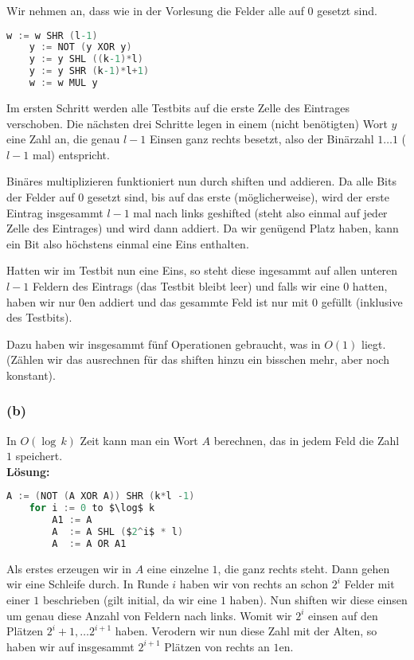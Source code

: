 \documentclass[11pt,a4paper,ngerman]{article}
\begin{document}
Wir nehmen an, dass wie in der Vorlesung die Felder alle auf $0$ gesetzt sind.

\begin{lstlisting}[frame=single, language=C,morekeywords={:=,SHR,SHL,NOT,XOR,AND,OR,MUL}]
	w := w SHR (l-1)
	y := NOT (y XOR y)
	y := y SHL ((k-1)*l)
	y := y SHR (k-1)*l+1)
	w := w MUL y
\end{lstlisting}

Im ersten Schritt werden alle Testbits auf die erste Zelle des Eintrages verschoben. Die nächsten drei Schritte
legen in einem (nicht benötigten) Wort $y$ eine Zahl an, die genau $l-1$ Einsen ganz rechts besetzt, also der Binärzahl
$1\ldots1$ ($l-1$ mal) entspricht.

Binäres multiplizieren funktioniert nun durch shiften und addieren. Da alle Bits der Felder auf $0$ gesetzt sind, bis auf das erste (möglicherweise),
wird der erste Eintrag insgesammt $l-1$ mal nach links geshifted (steht also einmal auf jeder Zelle des Eintrages) und wird dann addiert.
Da wir genügend Platz haben, kann ein Bit also höchstens einmal eine Eins enthalten.

Hatten wir im Testbit nun eine Eins, so steht diese ingesammt auf allen unteren $l-1$ Feldern des Eintrags (das Testbit bleibt leer) und
falls wir eine $0$ hatten, haben wir nur $0$en addiert und das gesammte Feld ist nur mit $0$ gefüllt (inklusive des Testbits).

Dazu haben wir insgesammt fünf Operationen gebraucht, was in $O(1)$ liegt. (Zählen wir das ausrechnen für das shiften hinzu ein bisschen mehr, aber noch konstant).

\subsubsection*{(b)}
In $O(\log \, k)$ Zeit kann man ein Wort $A$ berechnen, das in jedem Feld die Zahl $1$ speichert.\\

\noindent\textbf{Lösung:}\\

\begin{lstlisting}[frame=single, language=C,morekeywords={:=,SHR,SHL,NOT,XOR,AND,OR,MUL}]
	A := (NOT (A XOR A)) SHR (k*l -1)
	for i := 0 to $\log$ k
		A1 := A
		A  := A SHL ($2^i$ * l)
		A  := A OR A1
\end{lstlisting}

Als erstes erzeugen wir in $A$ eine einzelne $1$, die ganz rechts steht. Dann gehen wir eine Schleife durch. In Runde $i$ haben
wir von rechts an schon $2^i$ Felder mit einer $1$ beschrieben (gilt initial, da wir eine $1$ haben). Nun shiften wir diese einsen
um genau diese Anzahl von Feldern nach links. Womit wir $2^i$ einsen auf den Plätzen $2^i+1, \ldots 2^{i+1}$ haben. 
Verodern wir nun diese Zahl mit der Alten, so haben wir auf insgesammt $2^{i+1}$ Plätzen von rechts an $1$en.
\end{document}
